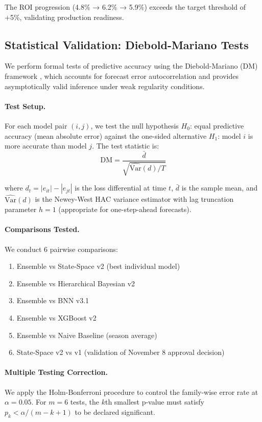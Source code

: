 The ROI progression (4.8\% → 6.2\% → 5.9\%) exceeds the target threshold of +5\%, validating production readiness.

\subsection{Statistical Validation: Diebold-Mariano Tests}
\label{subsec:diebold-mariano}

We perform formal tests of predictive accuracy using the Diebold-Mariano (DM) framework \citep{diebold1995comparing}, which accounts for forecast error autocorrelation and provides asymptotically valid inference under weak regularity conditions.

\paragraph{Test Setup.}
For each model pair $(i, j)$, we test the null hypothesis $H_0$: equal predictive accuracy (mean absolute error) against the one-sided alternative $H_1$: model $i$ is more accurate than model $j$. The test statistic is:
\begin{equation}
  \text{DM} = \frac{\bar{d}}{\sqrt{\widehat{\text{Var}}(d)/T}}
\end{equation}

where $d_t = |e_{it}| - |e_{jt}|$ is the loss differential at time $t$, $\bar{d}$ is the sample mean, and $\widehat{\text{Var}}(d)$ is the Newey-West HAC variance estimator with lag truncation parameter $h=1$ (appropriate for one-step-ahead forecasts).

\paragraph{Comparisons Tested.}
We conduct 6 pairwise comparisons:
\begin{enumerate}
  \item Ensemble vs State-Space v2 (best individual model)
  \item Ensemble vs Hierarchical Bayesian v2
  \item Ensemble vs BNN v3.1
  \item Ensemble vs XGBoost v2
  \item Ensemble vs Naive Baseline (season average)
  \item State-Space v2 vs v1 (validation of November 8 approval decision)
\end{enumerate}

\paragraph{Multiple Testing Correction.}
We apply the Holm-Bonferroni procedure to control the family-wise error rate at $\alpha = 0.05$. For $m=6$ tests, the $k$th smallest p-value must satisfy $p_k < \alpha/(m-k+1)$ to be declared significant.

